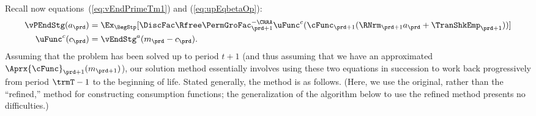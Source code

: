 Recall now equations~(\ref{eq:vEndPrimeTm1}) and (\ref{eq:upEqbetaOp}):
\begin{equation*}\begin{gathered}\begin{aligned}
      \vPEndStg({a}_{\prd})  & = \Ex_{\BegStp}[\DiscFac \Rfree \PermGroFac_{\prd+1}^{-\CRRA}
      \uFunc^{{c}}(\cFunc_{\prd+1}(\RNrm_{\prd+1} {a}_{\prd}+{\TranShkEmp}_{\prd+1}))]
      \\\uFunc^{{c}}({c}_{\prd})   & = \vEndStg^{{a}}({m}_{\prd}-{c}_{\prd}).
    \end{aligned}\end{gathered}\end{equation*}
Assuming that the problem has been solved up to period $t+1$ (and thus assuming that we have an approximated $\Aprx{\cFunc}_{\prd+1}({m}_{\prd+1})$), our solution method essentially involves using these two equations in succession to work back progressively from period $\trmT-1$ to the beginning of life.  Stated generally, the method is as follows.  (Here, we use the original, rather than the ``refined,'' method for constructing consumption functions; the generalization of the algorithm below to use the refined method presents no difficulties.)

